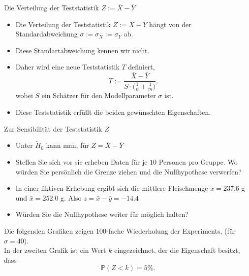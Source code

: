 \documentclass[usenames,dvipsnames,handout]{beamer}
\begin{document}
\begin{frame}{Die Verteilung der Teststatistik $Z:=\bar{X}-\bar{Y}$}
\begin{itemize}
\item{Die Verteilung der Teststatistik $Z:=\bar{X}-\bar{Y}$  
hängt von der Standardabweichung $\sigma:=\sigma_{X}:=\sigma_{Y}$ ab.}
\item{Diese Standartabweichung kennen wir nicht. }
\item{Daher wird eine neue Teststatistik $T$ definiert,
\begin{equation*}
T:=\frac{\bar{X}-\bar{Y}}{S \cdot \bigg(\frac{1}{n} + \frac{1}{m} \bigg)},
\end{equation*}
wobei $S$ ein Schätzer für den Modellparameter $\sigma$ ist.
}
\item{Diese Teststatistik erfüllt die beiden gewünschten Eigenschaften.}
\end{itemize}
\end{frame}
\begin{frame}{Zur Sensibilität der Teststatistik $Z$}
\begin{itemize}
\item{Unter $\tilde{H}_{0}$ kann man, für $Z=\bar{X}-\bar{Y}$}\pause
\item{Stellen Sie sich vor sie erheben Daten für je $10$ Personen pro Gruppe. Wo würden Sie persönlich die Grenze ziehen
und die Nullhypothese verwerfen?}\pause
\item{In einer fiktiven Erhebung ergibt sich die mittlere Fleischmenge $\bar{x}=237.6$ g und  $\bar{x}=252.0$ g.
Also $z=\bar{x}-\bar{y}=-14.4$}\pause
\item{Würden Sie die Nullhypothese weiter für möglich halten?}
\end{itemize}
Die folgenden Grafiken zeigen $100$-fache Wiederholung der Experiments, (für $\sigma=40$). \\ \pause
In der zweiten Grafik ist ein Wert $k$ eingezeichnet, der die Eigenschaft besitzt, dass
$$
\mathbb{P}(Z<k)=5\%.
$$
\end{frame}
\end{document}
